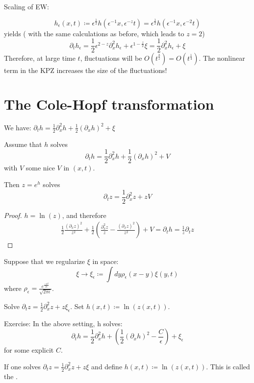 Scaling of EW:

\[h_\epsilon(x,t)\coloneqq \epsilon^{\frac{1}{2}}h(\epsilon^{-1}x,\epsilon^{-z}t)=\epsilon^{\frac{1}{2}}h(\epsilon^{-1}x,\epsilon^{-2}t)\]
yields ( with the same calculations as before, which leads to $z=2$) 
\[\partial_t h_\epsilon = \frac{1}{2}\epsilon^{2-z}\partial_x^2 h_\epsilon+\epsilon^{1-\frac{z}{2}}\xi=\frac{1}{2}\partial_x^2 h_\epsilon+\xi\]
Therefore, at large time $t$, fluctuations will be $O(t^{\frac{b}{z}})=O(t^{\frac{1}{4}})$. The nonlinear term in the KPZ increases the size of the fluctuations!

\section{The Cole-Hopf transformation}
We have: $\partial_t h=\frac{1}{2}\partial_x^2 h +\frac{1}{2}(\partial_x h )^2+\xi$

\begin{lemma}\label{lem:5.5}
    Assume that $h$ solves
    \[\partial_t h = \frac{1}{2}\partial_x^2h + \frac{1}{2}(\partial_x h)^2+V\]
    with $V$ some nice $V$ in $(x,t)$.

    Then $z=e^h$ solves 
    \[\partial_t z = \frac{1}{2}\partial_x^2 z + zV\]
\end{lemma}

\begin{proof}
    $h=\ln(z)$, and therefore 
    \begin{align*}
        \frac{1}{2}\frac{(\partial_x z)^2}{z^2}+\frac{1}{2}\left(\frac{\partial_x^2 z}{z}-\frac{(\partial_x z)^2}{z^2}\right)+V=\partial_t h= \frac{1}{z}\partial_t z
    \end{align*}
\end{proof}

Suppose that we regularize $\xi$ in space:
\[\xi\to\xi_\epsilon\coloneqq \int dy \rho_\epsilon(x-y)\xi(y,t)\]
where $\rho_\epsilon=\frac{e^{\frac{-x^2}{2\epsilon}}}{\sqrt{2\pi \epsilon}}$.

Solve $\partial_t z = \frac{1}{2}\partial_x^2 z + z\xi_\epsilon$. Set $h(x,t)\coloneqq \ln(z(x,t)).$

Exercise: In the above setting, h solves:
\[\partial_t h = \frac{1}{2}\partial_x^2 h + \left(\frac{1}{2}(\partial_x h)^2-\frac{C}{\epsilon}\right)+\xi_\epsilon\]
for some explicit $C$.

If one solves $\partial_t z = \frac{1}{2}\partial_x^2 z + z\xi$ and define $h(x,t)\coloneqq \ln(z(x,t))$.
This is called the .


